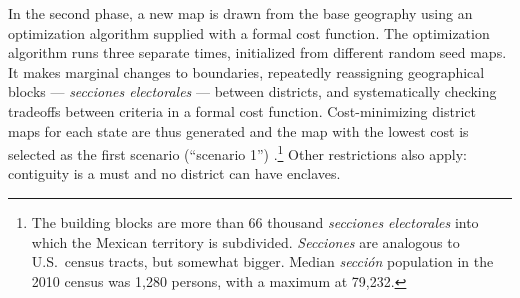 \documentclass[letter,12pt]{article}
\begin{document}

In the second phase, a new map is drawn from the base geography using an optimization algorithm supplied with a formal cost function. The optimization algorithm runs three separate times, initialized from different random seed maps. It makes marginal changes to boundaries, repeatedly reassigning geographical blocks --- \emph{secciones electorales} --- between districts, and systematically checking tradeoffs between criteria in a formal cost function. Cost-minimizing district maps for each state are thus generated and the map with the lowest cost is selected as the first scenario (``scenario 1'') \citep{trelles.mtz.tesisItam.2007}.\footnote{The building blocks are more than 66 thousand \emph{secciones electorales} into which the Mexican territory is subdivided. \emph{Secciones} are analogous to U.S.\ census tracts, but somewhat bigger. Median \emph{secci\'on} population in the 2010 census was 1,280 persons, with a maximum at 79,232.} Other restrictions also apply: contiguity is a must and no district can have enclaves.  
\end{document}
